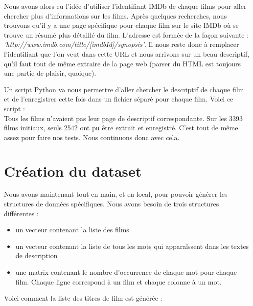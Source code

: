 Nous avons alors eu l'idée d'utiliser l'identifiant IMDb de chaque films pour aller chercher plus d'informations sur les films. Après quelques recherches, nous trouvons qu'il y a une page spécifique pour chaque film sur le site IMDb où se trouve un résumé plus détaillé du film. L'adresse est formée de la façon suivante : \textit{'http://www.imdb.com/title/[imdbId]/synopsis'}. Il nous reste donc à remplacer l'identifiant que l'on veut dans cette URL et nous arrivons sur un beau descriptif, qu'il faut tout de même extraire de la page web (parser du HTML est toujours une partie de plaisir, quoique).

Un script Python va nous permettre d'aller chercher le descriptif de chaque film et de l'enregistrer cette fois dans un fichier séparé pour chaque film. Voici ce script : \\



Tous les films n'avaient pas leur page de descriptif correspondante. Sur les 3393 films initiaux, seuls 2542 ont pu être extrait et enregistré. C'est tout de même assez pour faire nos tests. Nous continuons donc avec cela.

\section{Création du dataset}

Nous avons maintenant tout en main, et en local, pour pouvoir générer les structures de données spécifiques. Nous avons besoin de trois structures différentes :

\begin{itemize}
 \item un vecteur contenant la liste des films
 \item un vecteur contenant la liste de tous les mots qui apparaîssent dans les textes de description 
 \item une matrix contenant le nombre d'occurrence de chaque mot pour chaque film. Chaque ligne correspond à un film et chaque colonne à un mot.
\end{itemize}

\vspace{0.4cm}
%
Voici comment la liste des titres de film est générée : \\

